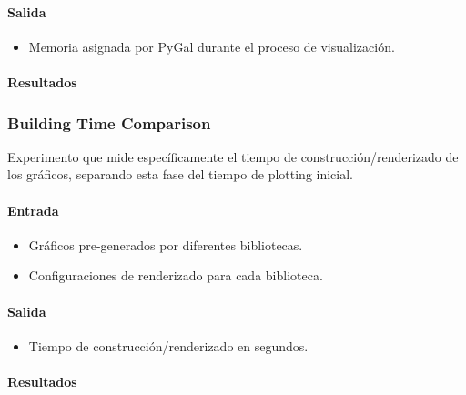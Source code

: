 \paragraph{Salida}
\begin{itemize}
    \item Memoria asignada por PyGal durante el proceso de visualización.
\end{itemize}

\paragraph{Resultados}
\vspace{0.5em}
\noindent

\PyGalMemoryAllocation
\newpage

\subsubsection{Building Time Comparison}
\label{building_time_comparison}

Experimento que mide específicamente el tiempo de construcción/renderizado de los gráficos, separando esta fase del tiempo de plotting inicial.

\paragraph{Entrada}
\begin{itemize}
    \item Gráficos pre-generados por diferentes bibliotecas.
    \item Configuraciones de renderizado para cada biblioteca.
\end{itemize}

\paragraph{Salida}
\begin{itemize}
    \item Tiempo de construcción/renderizado en segundos.
\end{itemize}

\paragraph{Resultados}
\vspace{0.5em}
\noindent

\BuildingTimeComparison
\newpage
